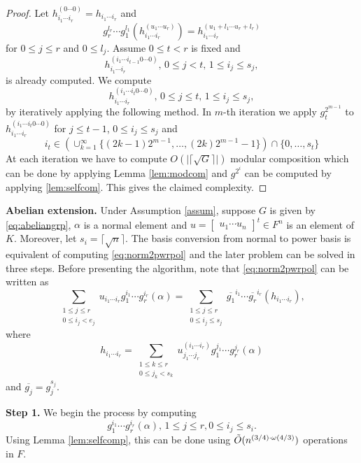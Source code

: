 \begin{proof}
Let $h_{i_1 \cdots i_r}^{(0 \cdots 0)} = h_{i_1 \cdots i_r}$ and $$g_r^{l_r} \cdots g_1^{l_1}(h_{i_1 \cdots i_r}^{(u_1 \cdots u_r)}) = h_{i_1 \cdots i_r}^{(u_1+l_1 \cdots u_r+l_r)}$$ for $0 \leq j \leq r$ and $0 \leq l_j$.
Assume $0 \leq t < r$ is fixed and $$h_{i_1 \cdots i_r}^{(i_1 \cdots i_{t-1}0 \cdots 0)}, \, 0 \leq j < t, \, 
1 \leq i_j \leq s_j,$$ is already computed. We compute 
$$h_{i_1 \cdots i_r}^{(i_1 \cdots i_{t}0 \cdots 0)}, \, 0 \leq j \leq t, \, 1 \leq i_j \leq s_j,$$
by iteratively applying the following method. In $m$-th iteration we apply $g_t^{2^{m-1}}$ to $h_{i_1 \cdots i_r}^{(i_1 \cdots i_{t}0 \cdots 0)}$ for $j \leq t-1$, $0 \leq i_j \leq s_j$ and 
$$i_t \in \left(\cup_{k = 1}^{\infty} \lbrace (2k-1)2^{m-1}, \ldots , (2k)2^{m-1}-1 \rbrace\right) \cap \lbrace 0 , \ldots , s_t \rbrace $$
At each iteration we have to compute $O(\vert \lceil \sqrt{G} \rceil \vert)$ modular composition which can be done by applying
Lemma \ref{lem:modcom} and $g^{2^i}$ can be computed by applying \ref{lem:selfcom}. This gives the claimed complexity.
\end{proof}

\textbf{Abelian extension.} Under Assumption \ref{assum}, suppose $G$ is given by \eqref{eq:abeliangrp}, $\alpha$ is a normal
element and $u = \begin{bmatrix} u_1 \cdots u_n \end{bmatrix}^t \in F^n$ is an element of $K$. Moreover, let 
$s_i = \lceil \sqrt{n} \rceil$. The basis conversion from normal to power basis is equivalent of computing \eqref{eq:norm2pwrpol} and
the later problem can be solved in three steps. Before presenting the algorithm, note that \eqref{eq:norm2pwrpol} can be written
as 
$$\sum_{\substack{1 \leq j \leq r\\ 0 \leq i_j < e_j}} u_{i_1 \cdots i_r} g_1^{i_1} \cdots g_r^{i_r}(\alpha) = \sum_{\substack{1 \leq j \leq r\\ 0 \leq i_j \leq s_j}} \overline{g_1}^{i_1} \cdots \overline{g_r}^{i_r} (h_{i_1 \cdots i_r}),$$ 
where $$h_{i_1 \cdots i_r} = \sum_{\substack{1 \leq k \leq r\\ 0 \leq j_k < s_k}} u^{(i_1 \cdots i_r)}_{j_1 \cdots j_r}
g_1^{j_1} \cdots g_r^{j_r}(\alpha)$$ and $\overline{g_j} = g_j^{s_j}$.

\textbf{Step 1.} We begin the process by computing $$g_1^{i_1} \cdots g_r^{i_r}(\alpha), \, 1 \leq j \leq r, 0 \leq i_j \leq s_i.$$
Using Lemma \ref{lem:selfcomp}, this can be done using $\tilde{O}(n^{(3/4)\cdot \omega(4/3)})$ operations in $F$.

